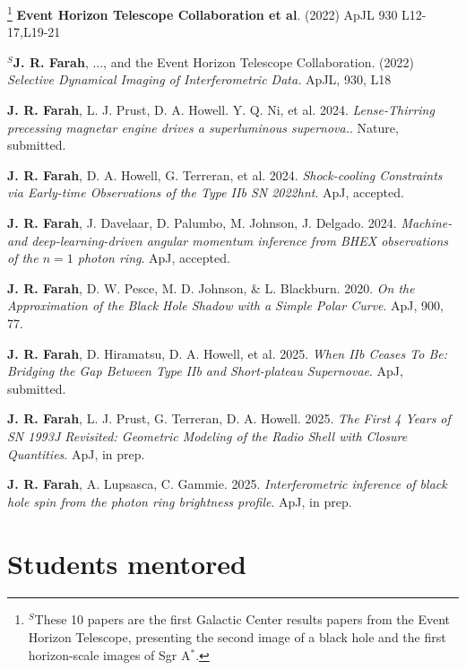 \documentclass[margin,line]{res}
\begin{document}
\begin{resume}
\footnote[$^S$]{\noindent $^S$These 10  papers are the first Galactic Center results papers from the Event Horizon Telescope, presenting the second image of a black hole and the first horizon-scale images of Sgr A$^\ast$.}
\textbf{Event Horizon Telescope Collaboration et al}. (2022) ApJL 930 L12-17,L19-21

\textbf{$^S$J. R. Farah}, ..., and the Event Horizon Telescope Collaboration. (2022) \textit{Selective Dynamical Imaging of Interferometric Data.} ApJL, 930, L18

\textbf{J. R. Farah}, L. J. Prust, D. A. Howell. Y. Q. Ni, et al. 2024. \textit{Lense-Thirring precessing magnetar engine drives a superluminous supernova.}. Nature, submitted.


\textbf{J. R. Farah}, D. A. Howell, G. Terreran, et al. 2024. \textit{Shock-cooling Constraints via Early-time Observations of the Type IIb SN 2022hnt}. ApJ, accepted.


\textbf{J. R. Farah}, J. Davelaar, D. Palumbo, M. Johnson, J. Delgado. 2024. \textit{Machine- and deep-learning-driven angular momentum inference from BHEX observations of the $n = 1$ photon ring}. ApJ, accepted.

\textbf{J. R. Farah}, D. W. Pesce, M. D. Johnson, \& L. Blackburn. 2020. \textit{On the Approximation of the Black Hole Shadow with a Simple Polar Curve}. ApJ, 900, 77.


\textbf{J. R. Farah}, D. Hiramatsu, D. A. Howell, et al. 2025. \textit{When IIb Ceases To Be: Bridging the Gap Between Type IIb and Short-plateau Supernovae}. ApJ, submitted.

\textbf{J. R. Farah}, L. J. Prust, G. Terreran, D. A. Howell. 2025. \textit{The First 4 Years of SN 1993J Revisited: Geometric Modeling of the Radio Shell with Closure Quantities}. ApJ, in prep.

\textbf{J. R. Farah}, A. Lupsasca, C. Gammie. 2025. \textit{Interferometric inference of black hole spin from the photon ring brightness profile}. ApJ, in prep.






\vspace{+.4cm}
\section{\sc Students mentored}


\end{resume}
\end{document}
